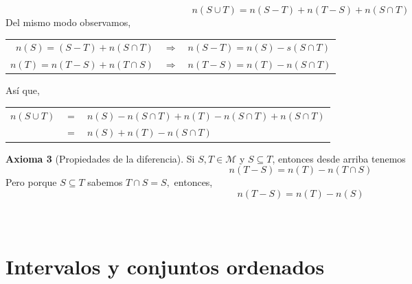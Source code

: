 \begin{enumerate}[ \bfseries 1.]
	$$n(S\cup T)=n(S-T) + n(T-S) + n(S \cap T)$$
	Del mismo modo observamos,
	\begin{center}
	    \begin{tabular}{r c l}
		$n(S) = (S-T) + n(S\cap T)$ & $\Rightarrow$ & $n(S-T) = n(S) -s(S\cap T)$\\
		$n(T) = n(T-S) + n(T\cap S)$ & $\Rightarrow$ & $n(T-S)=n(T) - n(S\cap T)$\\
	    \end{tabular}
	\end{center}
	Así que, 
	\begin{center}
	    \begin{tabular}{rcl}
		$n(S\cup T)$ & $=$ & $n(S) -n(S\cap T) + n(T) -n(S\cap T) +n(S\cap T)$\\
		 & $=$ & $n(S) +n(T) -n(S\cap T)$\\
	    \end{tabular}
	\end{center}
	\textbf{Axioma 3} (Propiedades de la diferencia). Si $S,T \in \mathcal{M}$ y $S\subseteq T$, entonces desde arriba tenemos $$n(T-S)=n(T) -n(T\cap S)$$
	Pero porque $S\subseteq T$ sabemos $T\cap S = S,$ entonces,
	$$n(T-S)=n(T)-n(S)$$\\\\

    \end{enumerate}

\section{Intervalos y conjuntos ordenados}

